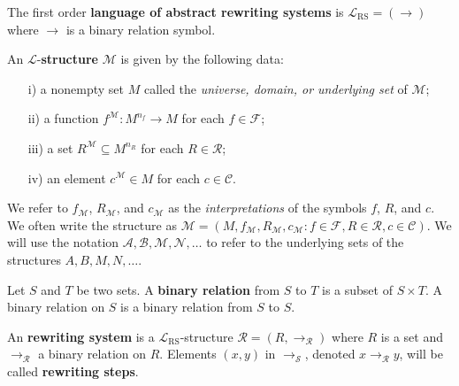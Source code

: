 \begin{definition}
  \label{def:l_ars}
  The first order \textbf{language of abstract rewriting systems} is $\mathcal{L}_\text{RS} \mathop{=} (\rightarrow)$ where $\rightarrow$ is a binary relation symbol.
\end{definition}
\begin{definition}
  An \( \mathcal{L} \)-\textbf{structure} \( \mathcal{M} \) is given by the following data:
 \begin{itemize}
     \item[i)] a nonempty set \( M \) called the \textit{universe, domain, or underlying set} of \( \mathcal{M} \);
     \item[ii)] a function \( f^{\mathcal{M}} : M^{n_f} \mathop{\to} M \) for each \( f \mathop{\in} \mathcal{F} \);
     \item[iii)] a set \( R^{\mathcal{M}} \mathop{\subseteq} M^{n_R} \) for each \( R \mathop{\in} \mathcal{R} \);
     \item[iv)] an element \( c^{\mathcal{M}} \mathop{\in} M \) for each \( c \mathop{\in} \mathcal{C} \).
 \end{itemize}
\end{definition}
We refer to \( f_{\mathcal{M}} \), \( R_{\mathcal{M}} \), and \( c_{\mathcal{M}} \) as the \textit{interpretations} of the symbols \( f \), \( R \), and \( c \). We often write the structure as \( \mathcal{M} \mathop{=} (M, f_{\mathcal{M}}, R_{\mathcal{M}}, c_{\mathcal{M}} : f \mathop{\in} \mathcal{F}, R \mathop{\in} \mathcal{R}, c \mathop{\in} \mathcal{C}) \). We will use the notation \( \mathcal{A}, \mathcal{B}, \mathcal{M}, \mathcal{N}, \dots \) to refer to the underlying sets of the structures \( A, B, M, N, \dots \).
\begin{definition}
  Let $S$ and $T$ be two sets. A \textbf{binary relation} from $S$ to $T$ is a subset of $S \mathop{\times} T$. A binary relation on $S$ is a binary relation from $S$ to $S$.
\end{definition} 

\begin{definition}
  \label{def:ars}
  An \textbf{rewriting system} is a $\mathcal{L}_\text{RS}$-structure $\mathcal{R} \mathop{=} (R,\to_\mathcal{R})$ where $R$ is a set and $\to_\mathcal{R}$ a binary relation on $R$. Elements $(x,y)$ in $\rightarrow_\mathcal{S}$, denoted $x \rightarrow_\mathcal{R} y$, will be called \textbf{rewriting steps}. 
\end{definition}

